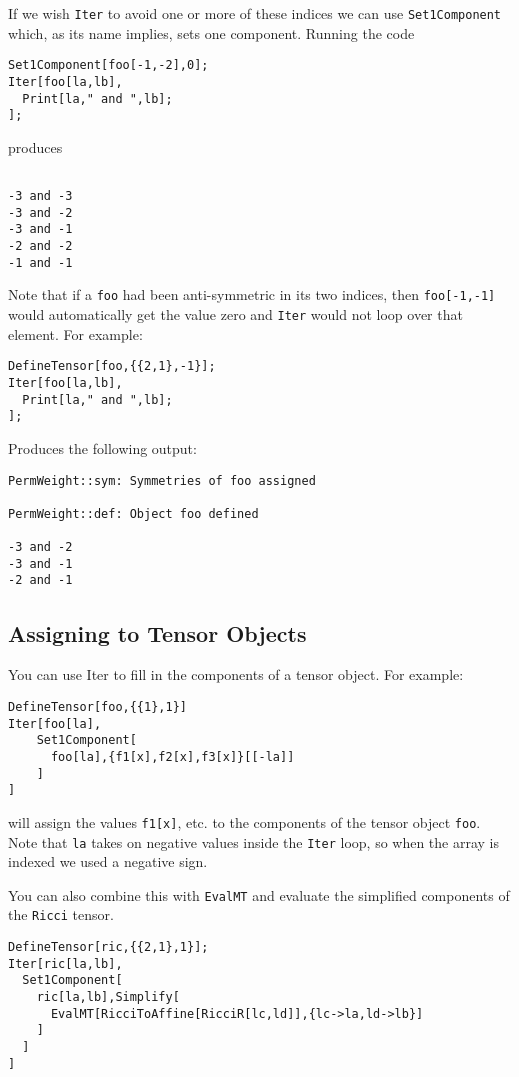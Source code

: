 If we wish {\tt Iter} to avoid one or more of these indices
we can use {\tt Set1Component} which, as its name implies, sets
one component.  Running the code
\begin{verbatim}
Set1Component[foo[-1,-2],0];
Iter[foo[la,lb],
  Print[la," and ",lb];
];
\end{verbatim}
produces
\begin{verbatim}

-3 and -3
-3 and -2
-3 and -1
-2 and -2
-1 and -1
\end{verbatim}
Note that if a {\tt foo} had been anti-symmetric in its two
indices, then {\tt foo[-1,-1]} would automatically get the value
zero and {\tt Iter} would not loop over that element.  For example:
\begin{verbatim}
DefineTensor[foo,{{2,1},-1}];
Iter[foo[la,lb],
  Print[la," and ",lb];
];
\end{verbatim}
Produces the following output:
\begin{verbatim}
PermWeight::sym: Symmetries of foo assigned

PermWeight::def: Object foo defined

-3 and -2
-3 and -1
-2 and -1
\end{verbatim}
\subsection{Assigning to Tensor Objects}
You can use Iter to fill in the components of a tensor object.
For example:
\begin{verbatim}
DefineTensor[foo,{{1},1}]
Iter[foo[la],
    Set1Component[
      foo[la],{f1[x],f2[x],f3[x]}[[-la]]
    ]
]
\end{verbatim}
will assign the values {\tt f1[x]}, etc. to the components of
the tensor object {\tt foo}.  Note that {\tt la} takes on negative
values inside the {\tt Iter} loop, so when the array is indexed
we used a negative sign.

You can also combine this with {\tt EvalMT} and evaluate the
simplified components of the {\tt Ricci} tensor.
\begin{verbatim}
DefineTensor[ric,{{2,1},1}];
Iter[ric[la,lb],
  Set1Component[
    ric[la,lb],Simplify[
      EvalMT[RicciToAffine[RicciR[lc,ld]],{lc->la,ld->lb}]
    ]
  ]
]
\end{verbatim}


